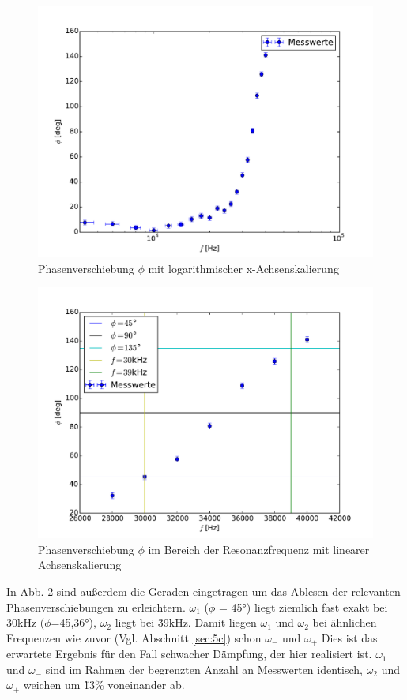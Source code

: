 \begin{figure}
  \centering
  \includegraphics[width=\textwidth]{5d.pdf}
  \caption{Phasenverschiebung $\phi$ mit logarithmischer x-Achsenskalierung}
  \label{fig:5dlog}
\end{figure}

\begin{figure}
  \centering
  \includegraphics[width=\textwidth]{5d2.pdf}
  \caption{Phasenverschiebung $\phi$ im Bereich der Resonanzfrequenz mit
  linearer Achsenskalierung}
  \label{fig:5dlin}
\end{figure}

In Abb. \ref{fig:5dlin} sind außerdem die Geraden eingetragen um das Ablesen
der relevanten Phasenverschiebungen zu erleichtern.
$\omega_1$ ($\phi$ = 45°) liegt ziemlich fast exakt bei 30kHz ($\phi$=45,36°),
$\omega_2$ liegt bei \~ 39kHz. Damit liegen $\omega_1$ und $\omega_2$ bei
ähnlichen Frequenzen wie zuvor (Vgl. Abschnitt \ref{sec:5c}) schon $\omega_-$
und $\omega_+$ Dies ist das erwartete Ergebnis für den Fall schwacher
Dämpfung, der hier realisiert ist. $\omega_1$ und $\omega_-$ sind im Rahmen
der begrenzten Anzahl an Messwerten identisch, $\omega_2$ und $\omega_+$ weichen
um \~13\% voneinander ab.
